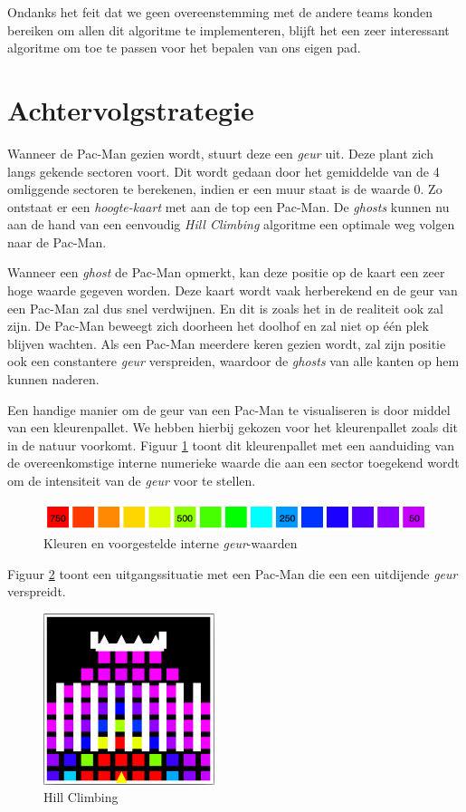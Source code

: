 \documentclass[12pt,a4paper]{report}
\begin{document}
Ondanks het feit dat we geen overeenstemming met de andere teams konden bereiken om allen dit algoritme te implementeren, blijft het een zeer interessant algoritme om toe te passen voor het bepalen van ons eigen pad.

\section{Achtervolgstrategie}

Wanneer de Pac-Man gezien wordt, stuurt deze een \emph{geur} uit. Deze plant zich langs gekende sectoren voort. Dit wordt gedaan door het gemiddelde van de 4 omliggende sectoren te berekenen, indien er een muur staat is de waarde 0. Zo ontstaat er een \emph{hoogte-kaart} met aan de top een Pac-Man. De \emph{ghosts} kunnen nu aan de hand van een eenvoudig \emph{Hill Climbing} algoritme een optimale weg volgen naar de Pac-Man.

Wanneer een \emph{ghost} de Pac-Man opmerkt, kan deze positie op de kaart een zeer hoge waarde gegeven worden. Deze kaart wordt vaak herberekend en de geur van een Pac-Man zal dus snel verdwijnen. En dit is zoals het in de realiteit ook zal zijn. De Pac-Man beweegt zich doorheen het doolhof en zal niet op \'e\'en plek blijven wachten. Als een Pac-Man meerdere keren gezien wordt, zal zijn positie ook een constantere \emph{geur} verspreiden, waardoor de \emph{ghosts} van alle kanten op hem kunnen naderen. 

Een handige manier om de geur van een Pac-Man te visualiseren is door middel van een kleurenpallet. We hebben hierbij gekozen voor het kleurenpallet zoals dit in de natuur voorkomt. Figuur \ref{fig:colormap} toont dit kleurenpallet met een aanduiding van de overeenkomstige interne numerieke waarde die aan een sector toegekend wordt om de intensiteit van de \emph{geur} voor te stellen.

\begin{figure}[htbp]
  \centering
  \includegraphics[width=150mm]{resources/colormap.png}
  \caption{Kleuren en voorgestelde interne \emph{geur}-waarden}
  \label{fig:colormap}
\end{figure}

Figuur \ref{fig:hillclimbing1} toont een uitgangssituatie met een Pac-Man die een een uitdijende \emph{geur} verspreidt.

\begin{figure}[htbp]
  \centering
  \includegraphics[width=50mm]{resources/hillclimbing1.png}
  \caption{Hill Climbing}
  \label{fig:hillclimbing1}
\end{figure}
\end{document}
